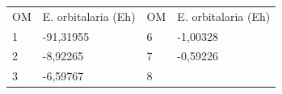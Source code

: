 \documentclass[]{article}
\begin{document}
\begin{longtable}[]{@{}llll@{}}
\toprule
\begin{minipage}[t]{0.22\columnwidth}\raggedright\strut
{OM}\strut
\end{minipage} & \begin{minipage}[t]{0.22\columnwidth}\raggedright\strut
{E. orbitalaria (E}{h}{)}\strut
\end{minipage} & \begin{minipage}[t]{0.22\columnwidth}\raggedright\strut
{OM}\strut
\end{minipage} & \begin{minipage}[t]{0.22\columnwidth}\raggedright\strut
{E. orbitalaria (E}{h}{)}\strut
\end{minipage}\tabularnewline
\begin{minipage}[t]{0.22\columnwidth}\raggedright\strut
{1}\strut
\end{minipage} & \begin{minipage}[t]{0.22\columnwidth}\raggedright\strut
{-91,31955}\strut
\end{minipage} & \begin{minipage}[t]{0.22\columnwidth}\raggedright\strut
{6}\strut
\end{minipage} & \begin{minipage}[t]{0.22\columnwidth}\raggedright\strut
{-1,00328}\strut
\end{minipage}\tabularnewline
\begin{minipage}[t]{0.22\columnwidth}\raggedright\strut
{2}\strut
\end{minipage} & \begin{minipage}[t]{0.22\columnwidth}\raggedright\strut
{-8,92265}\strut
\end{minipage} & \begin{minipage}[t]{0.22\columnwidth}\raggedright\strut
{7}\strut
\end{minipage} & \begin{minipage}[t]{0.22\columnwidth}\raggedright\strut
{-0,59226}\strut
\end{minipage}\tabularnewline
\begin{minipage}[t]{0.22\columnwidth}\raggedright\strut
{3}\strut
\end{minipage} & \begin{minipage}[t]{0.22\columnwidth}\raggedright\strut
{-6,59767}\strut
\end{minipage} & \begin{minipage}[t]{0.22\columnwidth}\raggedright\strut
{8}\strut
\end{minipage} & \begin{minipage}[t]{0.22\columnwidth}\raggedright\strut

\end{minipage}
\end{longtable}
\end{document}
